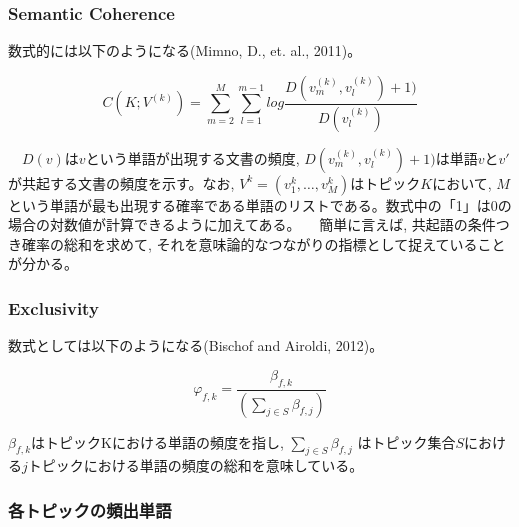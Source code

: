 \documentclass[
]{article}
\begin{document}
\hypertarget{semantic-coherence}{%
\subsubsection{Semantic Coherence}\label{semantic-coherence}}

数式的には以下のようになる(Mimno, D., et. al., 2011)。

\[C(K;V^{(k)}  )=  \sum_{m=2}^M\sum_{l=1}^{m-1} log\frac{ D(v_m^{(k)} ,v_l^{(k)}  )+1)}{D(v_l^{(k)} )}\]

　\(D(v)\)は\(v\)という単語が出現する文書の頻度,
\(D(v_m^{(k)} ,v_l^{(k)} )+1)\)は単語\(v\)と\(v'\)が共起する文書の頻度を示す。なお,
\(V^k=(v_1^k,…,v_M^k)\)はトピック\(K\)において,
\(M\)という単語が最も出現する確率である単語のリストである。数式中の「1」は0の場合の対数値が計算できるように加えてある。
　簡単に言えば, 共起語の条件つき確率の総和を求めて,
それを意味論的なつながりの指標として捉えていることが分かる。

\hypertarget{exclusivity}{%
\subsubsection{Exclusivity}\label{exclusivity}}

数式としては以下のようになる(Bischof and Airoldi, 2012)。

\[φ_{f,k}=  \frac{β_{f,k}}{(∑_{j∈S}β_{f,j} )}\]

\(β_{f,k}\)はトピックKにおける単語の頻度を指し, \(∑_{j∈S}β_{f,j}\)
はトピック集合\(S\)における\(j\)トピックにおける単語の頻度の総和を意味している。

\hypertarget{ux5404ux30c8ux30d4ux30c3ux30afux306eux983bux51faux5358ux8a9e}{%
\subsubsection{各トピックの頻出単語}\label{ux5404ux30c8ux30d4ux30c3ux30afux306eux983bux51faux5358ux8a9e}}
\end{document}

